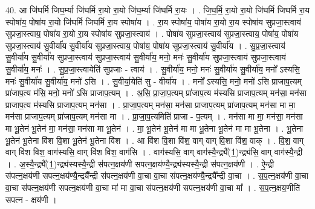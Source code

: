 \documentclass[17pt]{extarticle}
\begin{document}
40. आ जि॑घर्मि जिघ॒र्म्या जि॑घर्मि रा॒यो रा॒यो जि॑घ॒र्म्या जि॑घर्मि रा॒यः । . जि॒घ॒र्मि॒ रा॒यो रा॒यो जि॑घर्मि जिघर्मि रा॒य स्पोषा॑य॒ पोषा॑य रा॒यो जि॑घर्मि जिघर्मि रा॒य स्पोषा॑य । . रा॒य स्पोषा॑य॒ पोषा॑य रा॒यो रा॒य स्पोषा॑य सुप्रजा॒स्त्वाय॑ सुप्रजा॒स्त्वाय॒ पोषा॑य रा॒यो रा॒य स्पोषा॑य सुप्रजा॒स्त्वाय॑ । . पोषा॑य सुप्रजा॒स्त्वाय॑ सुप्रजा॒स्त्वाय॒ पोषा॑य॒ पोषा॑य सुप्रजा॒स्त्वाय॑ सु॒वीर्या॑य सु॒वीर्या॑य सुप्रजा॒स्त्वाय॒ पोषा॑य॒ पोषा॑य सुप्रजा॒स्त्वाय॑ सु॒वीर्या॑य । . सु॒प्र॒जा॒स्त्वाय॑ सु॒वीर्या॑य सु॒वीर्या॑य सुप्रजा॒स्त्वाय॑ सुप्रजा॒स्त्वाय॑ सु॒वीर्या॑य॒ मनो॒ मनः॑ सु॒वीर्या॑य सुप्रजा॒स्त्वाय॑ सुप्रजा॒स्त्वाय॑ सु॒वीर्या॑य॒ मनः॑ । . सु॒प्र॒जा॒स्त्वायेति॑ सुप्रजाः - त्वाय॑ । . सु॒वीर्या॑य॒ मनो॒ मनः॑ सु॒वीर्या॑य सु॒वीर्या॑य॒ मनो᳚ ऽस्यसि॒ मनः॑ सु॒वीर्या॑य सु॒वीर्या॑य॒ मनो॑ ऽसि । . सु॒वीर्या॒येति॑ सु - वीर्या॑य । . मनो᳚ ऽस्यसि॒ मनो॒ मनो॑ ऽसि प्राजाप॒त्यम् प्रा॑जाप॒त्य म॑सि॒ मनो॒ मनो॑ ऽसि प्राजाप॒त्यम् । . अ॒सि॒ प्रा॒जा॒प॒त्यम् प्रा॑जाप॒त्य म॑स्यसि प्राजाप॒त्यम् मन॑सा॒ मन॑सा प्राजाप॒त्य म॑स्यसि प्राजाप॒त्यम् मन॑सा । . प्रा॒जा॒प॒त्यम् मन॑सा॒ मन॑सा प्राजाप॒त्यम् प्रा॑जाप॒त्यम् मन॑सा मा मा॒ मन॑सा प्राजाप॒त्यम् प्रा॑जाप॒त्यम् मन॑सा मा । . प्रा॒जा॒प॒त्यमिति॑ प्राजा - प॒त्यम् । . मन॑सा मा मा॒ मन॑सा॒ मन॑सा मा भू॒तेन॑ भू॒तेन॑ मा॒ मन॑सा॒ मन॑सा मा भू॒तेन॑ । . मा॒ भू॒तेन॑ भू॒तेन॑ मा मा भू॒तेना भू॒तेन॑ मा मा भू॒तेना । . भू॒तेना भू॒तेन॑ भू॒तेना वि॑श वि॒शा भू॒तेन॑ भू॒तेना वि॑श । . आ वि॑श वि॒शा वि॑श॒ वाग् वाग् वि॒शा वि॑श॒ वाक् । . वि॒श॒ वाग् वाग् वि॑श विश॒ वाग॑स्यसि॒ वाग् वि॑श विश॒ वाग॑सि । . वाग॑स्यसि॒ वाग् वाग॑स्यै॒न्द्र्यै᳚(1॒)न्द्र्य॑सि॒ वाग् वाग॑स्यै॒न्द्री । . अ॒स्यै॒न्द्र्यै᳚(1॒)न्द्र्य॑स्यस्यै॒न्द्री स॑पत्न॒क्षय॑णी सपत्न॒क्षय॑ण्यै॒न्द्र्य॑स्यस्यै॒न्द्री स॑पत्न॒क्षय॑णी । . ऐ॒न्द्री स॑पत्न॒क्षय॑णी सपत्न॒क्षय॑ण्यै॒न्द्र्यै᳚न्द्री स॑पत्न॒क्षय॑णी वा॒चा वा॒चा स॑पत्न॒क्षय॑ण्यै॒न्द्र्यै᳚न्द्री वा॒चा । . स॒प॒त्न॒क्षय॑णी वा॒चा वा॒चा स॑पत्न॒क्षय॑णी सपत्न॒क्षय॑णी वा॒चा मा॑ मा वा॒चा स॑पत्न॒क्षय॑णी सपत्न॒क्षय॑णी वा॒चा मा᳚ । . स॒प॒त्न॒क्षय॒णीति॑ सपत्न - क्षय॑णी । \newline
\pagebreak
{}
\end{document}
